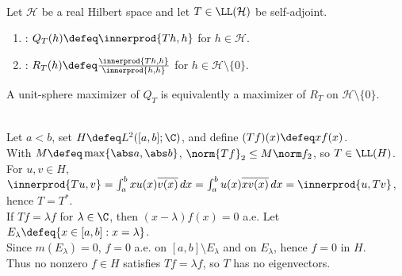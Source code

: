\begin{definition} \label{def:rayleigh-quotient-self-adjoint-operator} \\
Let $\mathcal{H}$ be a real Hilbert space and let $T\in\LL(\mathcal{H})$ be self-adjoint.
\begin{enumerate}[label=(\roman*)]
\setlength{\itemsep}{0pt}
\item {}: $Q_T(h)\defeq\innerprod{Th,h}$ for $h\in\mathcal{H}$.
\item {}: $R_T(h)\defeq\frac{\innerprod{Th,h}}{\innerprod{h,h}}$ for $h\in\mathcal{H}\setminus\{0\}$.
\end{enumerate}
A unit-sphere maximizer of $Q_T$ is equivalently a maximizer of $R_T$ on $\mathcal{H}\setminus\{0\}$.
\end{definition}

\begin{example} \label{ex:multiplication-self-adjoint-without-eigenvectors} \\
Let $a<b$, set $H\defeq L^2([a,b];\C)$, and define $(Tf)(x)\defeq xf(x)$.\\
With $M\defeq\max\{\abs a,\abs b\}$, $\norm{Tf}_2\leq M\norm f_2$, so $T\in\LL(H)$.\\
For $u,v\in H$, $\innerprod{Tu,v}=\int_a^b xu(x)\overline{v(x)}\,dx=\int_a^b u(x)\overline{xv(x)}\,dx=\innerprod{u,Tv}$, hence $T=T^*$.\\
If $Tf=\lambda f$ for $\lambda\in\C$, then $(x-\lambda)f(x)=0$ a.e. Let $E_\lambda\defeq\{x\in[a,b]:x=\lambda\}$.\\
Since $m(E_\lambda)=0$, $f=0$ a.e. on $[a,b]\setminus E_\lambda$ and on $E_\lambda$, hence $f=0$ in $H$.\\
Thus no nonzero $f\in H$ satisfies $Tf=\lambda f$, so $T$ has no eigenvectors.
\end{example}

